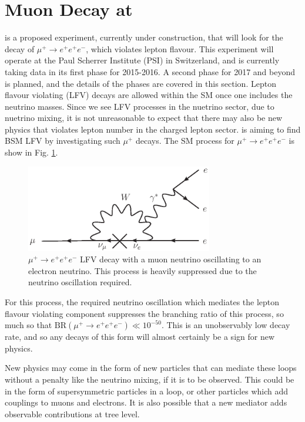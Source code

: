 \section{Muon Decay at \mueee}
\mueee \cite{Blondel:2013ia} is a proposed experiment, currently under construction, that will look for the decay of $\mu^+ \rightarrow e^+ e^+ e^-$, which violates lepton flavour.
This experiment will operate at the Paul Scherrer Institute (PSI) in Switzerland, and is currently taking data in its first phase for 2015-2016.
A second phase for 2017 and beyond is planned, and the details of the phases are covered in this section. 
Lepton flavour violating (LFV) decays are allowed within the SM once one includes the neutrino masses.
Since we see LFV processes in the nuetrino sector, due to nuetrino mixing, it is not unreasonable to expect that there may also be new physics that violates lepton number in the charged lepton sector.
\mueee is aiming to find BSM LFV by investigating such $\mu^+$ decays.
The SM process for $\mu^+ \rightarrow e^+ e^+ e^-$ is show in Fig. \ref{fig:mu_eee_SM}.
\begin{figure}[h]
    \centering
    \includegraphics[height = 1.5in]{Figures/feynman_diagrams/mu_eee_SM.eps}
    \caption[$\mu^+ \rightarrow e^+ e^+ e^-$ lepton flavour violating decay through neutrino oscillation.]{$\mu^+ \rightarrow e^+ e^+ e^-$ LFV decay with a muon neutrino oscillating to an electron neutrino. This process is heavily suppressed due to the neutrino oscillation required.}
    \label{fig:mu_eee_SM}
\end{figure}
For this process, the required neutrino oscillation which mediates the lepton flavour violating component suppresses the branching ratio of this process, so much so that $\textrm{BR}(\mu^+ \rightarrow e^+ e^+ e^-) \ll 10^{-50}$.
This is an unobservably low decay rate, and so any decays of this form will almost certainly be a sign for new physics.

New physics may come in the form of new particles that can mediate these loops without a penalty like the neutrino mixing, if it is to be observed.
This could be in the form of supersymmetric particles in a loop, or other particles which add couplings to muons and electrons.
It is also possible that a new mediator adds observable contributions at tree level.

